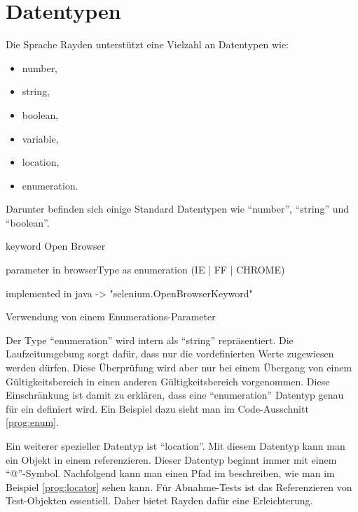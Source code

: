 \section{Datentypen}

Die Sprache Rayden unterstützt eine Vielzahl an Datentypen wie:

\begin{itemize}
\item number,
\item string,
\item boolean,
\item variable,
\item location,
\item enumeration.
\end{itemize}

\SuperPar
Darunter befinden sich einige Standard Datentypen wie "`number"', "`string"' und "`boolean"'. 

\begin{program}
\begin{JavaCode}
keyword Open Browser { 
	parameter in browserType as enumeration (IE | FF | CHROME)

	implemented in java -> "selenium.OpenBrowserKeyword"
}
\end{JavaCode}
\caption{Verwendung von einem Enumerations-Parameter}
\label{prog:enum}
\end{program}

\SuperPar
Der Type "`enumeration"' wird intern als "`string"' repräsentiert. Die Laufzeitumgebung sorgt dafür, dass nur die vordefinierten Werte zugewiesen werden dürfen. Diese Überprüfung wird aber nur bei einem Übergang von einem Gültigkeitsbereich in einen anderen Gültigkeitsbereich vorgenommen. Diese Einschränkung ist damit zu erklären, dass eine "`enumeration"' Datentyp genau für ein  definiert wird. Ein Beispiel dazu sieht man im Code-Ausschnitt \ref{prog:enum}.  

\SuperPar
Ein weiterer spezieller Datentyp ist "`location"'. Mit diesem Datentyp kann man ein Objekt in einem  referenzieren. Dieser Datentyp beginnt immer mit einem "`@"'-Symbol. Nachfolgend kann man einen Pfad im  beschreiben, wie man im Beispiel \ref{prog:locator} sehen kann. Für Abnahme-Tests ist das Referenzieren von Test-Objekten essentiell. Daher bietet Rayden dafür eine Erleichterung. 

